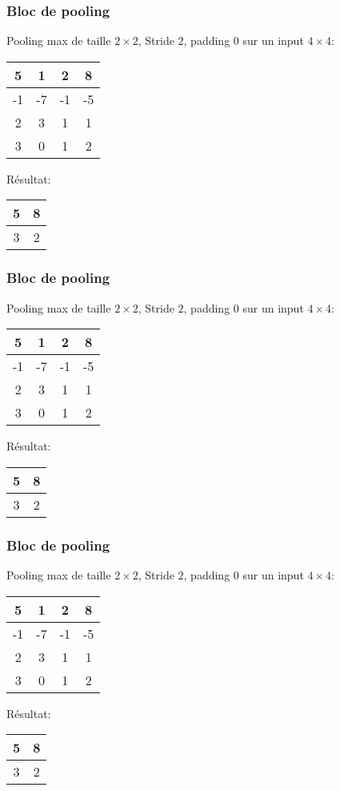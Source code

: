 \documentclass{formation}
\begin{document}
\begin{frame}
  \frametitle{Bloc de pooling}
  Pooling max de taille $2\times 2$, Stride $2$, padding $0$ sur un input $4 \times
  4$:
  \\[.5cm]
  \begin{tabular}{|c|c|c|c|}
    \hline
    \cellcolor{green}5 & \cellcolor{green}1 & 2 & 8 \\
    \hline
    \cellcolor{green}-1 & \cellcolor{green}-7 & -1 & -5 \\
    \hline
    2 & 3 & 1 & 1 \\
    \hline
    3 & 0 & 1 & 2 \\
    \hline
  \end{tabular}

  Résultat:
  \begin{tabular}{|c|c|}
    \hline
    \cellcolor{green}5 & 8 \\
    \hline
    3 & 2 \\
    \hline
  \end{tabular}
\end{frame}
\begin{frame}
  \frametitle{Bloc de pooling}
  Pooling max de taille $2\times 2$, Stride $2$, padding $0$ sur un input $4 \times
  4$:
  \\[.5cm]
  \begin{tabular}{|c|c|c|c|}
    \hline
    5 & 1 & \cellcolor{green}2 & \cellcolor{green}8 \\
    \hline
    -1 & -7 & \cellcolor{green}-1 & \cellcolor{green}-5 \\
    \hline
    2 & 3 & 1 & 1 \\
    \hline
    3 & 0 & 1 & 2 \\
    \hline
  \end{tabular}

  Résultat:
  \begin{tabular}{|c|c|}
    \hline
    5 & \cellcolor{green}8 \\
    \hline
    3 & 2 \\
    \hline
  \end{tabular}
\end{frame}
\begin{frame}
  \frametitle{Bloc de pooling}
  Pooling max de taille $2\times 2$, Stride $2$, padding $0$ sur un input $4 \times
  4$:
  \\[.5cm]
  \begin{tabular}{|c|c|c|c|}
    \hline
    5 & 1 & 2 & 8 \\
    \hline
    -1 & -7 & -1 & -5 \\
    \hline
    \cellcolor{green}2 & \cellcolor{green}3 & 1 & 1 \\
    \hline
    \cellcolor{green}3 & \cellcolor{green}0 & 1 & 2 \\
    \hline
  \end{tabular}

  Résultat:
  \begin{tabular}{|c|c|}
    \hline
    5 & 8 \\
    \hline
    \cellcolor{green}3 & 2 \\
    \hline
  \end{tabular}
\end{frame}
\end{document}
